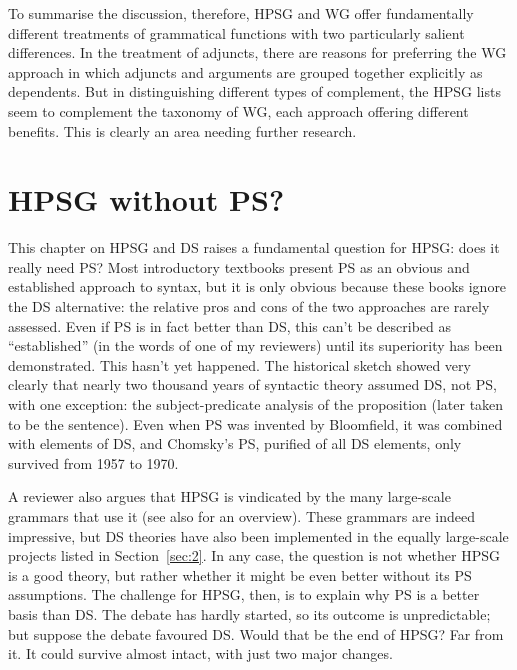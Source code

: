 \documentclass[output=paper,biblatex,babelshorthands,newtxmath,draftmode,colorlinks,citecolor=brown]{langscibook}
\begin{document}
To summarise the discussion, therefore, HPSG and WG offer fundamentally different treatments of
grammatical functions with two particularly salient differences. In the treatment of adjuncts, there
are reasons for preferring the WG approach in which adjuncts and arguments are grouped together
explicitly as dependents. But in distinguishing different types of complement, the HPSG lists seem
to complement the taxonomy of WG, each approach offering different benefits. This is clearly an area
needing further research.


\section{HPSG without PS?}
\label{sec:6}

This chapter on HPSG and DS raises a fundamental question for HPSG: does it really need PS? Most
introductory textbooks present PS as an obvious and established approach to syntax, but it is only
obvious because these books ignore the DS alternative: the relative pros and cons of the two
approaches are rarely assessed. Even if PS is in fact better than DS, this can't be described as
``established'' (in the words of one of my reviewers) until its superiority has been
demonstrated. This hasn't yet happened. The historical sketch showed very clearly that nearly two
thousand years of syntactic theory assumed DS, not PS, with one exception: the subject-predicate
analysis of the proposition (later taken to be the sentence). Even when PS was invented by
Bloomfield, it was combined with elements of DS, and Chomsky's PS, purified of all DS elements, only
survived from 1957 to 1970.

A reviewer also argues that HPSG is vindicated by the many large-scale grammars that use it (see
also  for an overview). These
grammars are indeed impressive, but DS theories have also been implemented in the equally
large-scale projects listed in Section~\ref{sec:2}. In any case, the question is not whether HPSG is
a good theory, but rather whether it might be even better without its PS assumptions. The challenge
for HPSG, then, is to explain why PS is a better basis than DS. The debate has hardly started, so
its outcome is unpredictable; but suppose the debate favoured DS. Would that be the end of HPSG? Far
from it. It could survive almost intact, with just two major changes.
\end{document}
